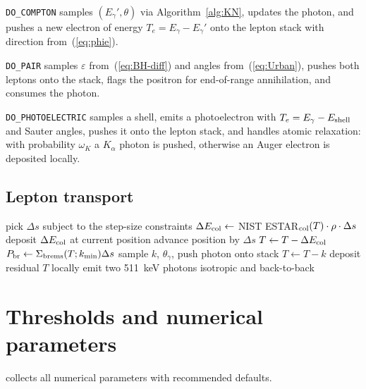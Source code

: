 \documentclass[11pt,a4paper]{article}
\newcommand{\Eg}{E_\gamma}
\newcommand{\Egp}{E_\gamma'}
\newcommand{\eps}{\varepsilon}
\newcommand{\Tcut}{T_e^{\rm cut}}
\newcommand{\kmin}{k_{\min}}
\begin{document}
\texttt{DO\_COMPTON} samples $(\Egp,\theta)$ via
Algorithm~\ref{alg:KN}, updates the photon, and pushes a new
electron of energy $T_e=\Eg-\Egp$ onto the lepton stack with
direction from~(\ref{eq:phie}).

\texttt{DO\_PAIR} samples $\eps$ from~(\ref{eq:BH-diff}) and angles
from~(\ref{eq:Urban}), pushes both leptons onto the stack, flags
the positron for end-of-range annihilation, and consumes the photon.

\texttt{DO\_PHOTOELECTRIC} samples a shell, emits a photoelectron
with $T_e=\Eg-E_{\rm shell}$ and Sauter angles, pushes it onto
the lepton stack, and handles atomic relaxation: with probability
$\omega_K$ a $K_\alpha$ photon is pushed, otherwise an Auger
electron is deposited locally.

\subsection{Lepton transport}

\begin{algorithm}[H]
\caption{\texttt{TRANSPORT\_LEPTON} for a single $e^\pm$ track.}
\begin{algorithmic}[1]
  \While{$T \ge \Tcut$}
    \State pick $\Delta s$ subject to the step-size constraints
    \State $\Delta E_{\rm col} \gets$ \textsc{NIST ESTAR}$_{\rm col}(T) \cdot \rho \cdot \Delta s$
    \State deposit $\Delta E_{\rm col}$ at current position
    \State advance position by $\Delta s$
    \State $T \gets T - \Delta E_{\rm col}$
    \State $P_{\rm br} \gets \Sigma_{\rm brems}(T;\kmin)\Delta s$
       \State sample $k$, $\theta_\gamma$, push photon onto stack
       \State $T \gets T - k$
    \EndIf
  \EndWhile
  \State deposit residual $T$ locally
     \State emit two \SI{511}{keV} photons isotropic and back-to-back
  \EndIf
\end{algorithmic}
\end{algorithm}

\section{Thresholds and numerical parameters}\label{sec:thresholds}

 collects all numerical parameters with
recommended defaults.
\end{document}

